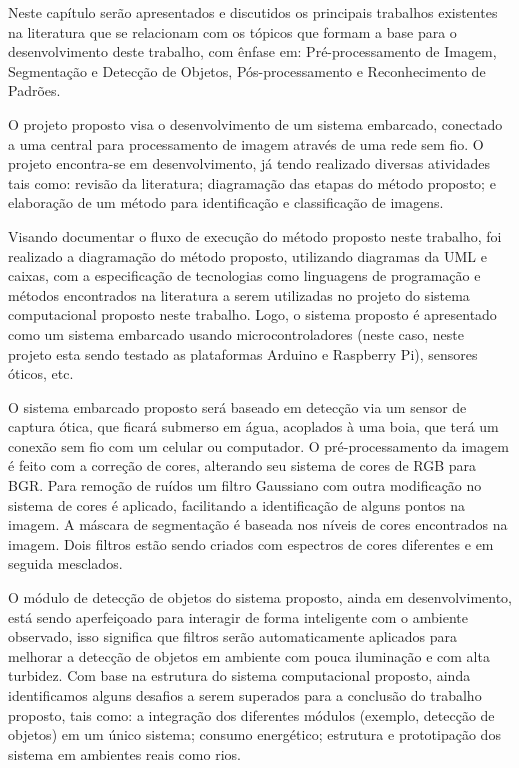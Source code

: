\label{chap:trab_cor}

Neste capítulo serão apresentados e discutidos os principais trabalhos existentes na literatura que se relacionam com os tópicos que formam a base para o desenvolvimento deste trabalho, com ênfase em: Pré-processamento de Imagem, Segmentação e Detecção de Objetos, Pós-processamento e Reconhecimento de Padrões.

    O projeto proposto visa o desenvolvimento de um sistema embarcado, conectado a uma central para processamento de imagem através de uma rede sem fio. O projeto encontra-se em desenvolvimento, já tendo realizado diversas atividades tais como: revisão da literatura; diagramação das etapas do método proposto; e elaboração de um método para identificação e classificação de imagens. 

     

       Visando documentar o fluxo de execução do método proposto neste trabalho, foi realizado a diagramação do método proposto, utilizando diagramas da UML e caixas, com a especificação de tecnologias como linguagens de programação e métodos encontrados na literatura a serem utilizadas no projeto do sistema computacional proposto neste trabalho. Logo, o sistema proposto é apresentado como um sistema embarcado usando  microcontroladores (neste caso, neste projeto esta sendo testado as plataformas Arduino e Raspberry Pi), sensores óticos, etc. 

       O sistema embarcado proposto será baseado em detecção via um sensor de captura ótica, que ficará submerso em água, acoplados à uma boia, que terá um conexão sem fio com um celular ou computador. O pré-processamento da imagem é feito com a correção de cores, alterando seu sistema de cores de RGB para BGR. Para remoção de ruídos um filtro Gaussiano com outra modificação no sistema de cores é aplicado, facilitando a identificação de alguns pontos na imagem. A máscara de segmentação é baseada nos níveis de cores encontrados na imagem. Dois filtros estão sendo criados com espectros de cores diferentes e em seguida mesclados. 

       O módulo  de detecção de objetos do sistema proposto, ainda em desenvolvimento, está sendo aperfeiçoado para interagir de forma inteligente com o ambiente observado, isso significa que filtros serão automaticamente aplicados para melhorar a detecção de objetos em ambiente com pouca iluminação e com alta turbidez. Com base na estrutura do sistema computacional proposto, ainda identificamos alguns desafios a serem superados para a conclusão do trabalho proposto, tais como: a integração dos diferentes módulos (exemplo, detecção de objetos) em um único sistema; consumo  energético; estrutura e prototipação dos sistema em ambientes reais como rios. 
	


